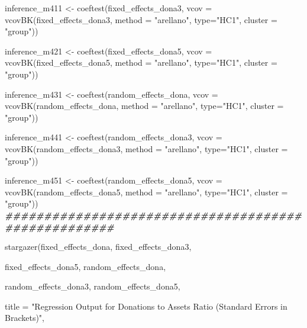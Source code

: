 \documentclass[a4paper,nobind]{templates/ociamthesis}
\newenvironment{Shaded}{\begin{snugshade}}{\end{snugshade}}
\newcommand{\AttributeTok}[1]{\textcolor[rgb]{0.77,0.63,0.00}{#1}}
\newcommand{\DocumentationTok}[1]{\textcolor[rgb]{0.56,0.35,0.01}{\textbf{\textit{#1}}}}
\newcommand{\FunctionTok}[1]{\textcolor[rgb]{0.00,0.00,0.00}{#1}}
\newcommand{\NormalTok}[1]{#1}
\newcommand{\OtherTok}[1]{\textcolor[rgb]{0.56,0.35,0.01}{#1}}
\newcommand{\StringTok}[1]{\textcolor[rgb]{0.31,0.60,0.02}{#1}}
\renewenvironment{Shaded}
{
  \vspace{10pt}%
  \begin{snugshade}%
}{%
  \end{snugshade}%
  \vspace{8pt}%
}
\begin{document}
\begin{landscape}
\begin{Shaded}
\begin{Highlighting}[]
\NormalTok{inference\_m411 }\OtherTok{\textless{}{-}} \FunctionTok{coeftest}\NormalTok{(fixed\_effects\_dona3, }\AttributeTok{vcov =} \FunctionTok{vcovBK}\NormalTok{(fixed\_effects\_dona3, }\AttributeTok{method =} \StringTok{"arellano"}\NormalTok{, }\AttributeTok{type=}\StringTok{"HC1"}\NormalTok{, }\AttributeTok{cluster =} \StringTok{"group"}\NormalTok{))}

\NormalTok{inference\_m421 }\OtherTok{\textless{}{-}} \FunctionTok{coeftest}\NormalTok{(fixed\_effects\_dona5, }\AttributeTok{vcov =} \FunctionTok{vcovBK}\NormalTok{(fixed\_effects\_dona5, }\AttributeTok{method =} \StringTok{"arellano"}\NormalTok{, }\AttributeTok{type=}\StringTok{"HC1"}\NormalTok{, }\AttributeTok{cluster =} \StringTok{"group"}\NormalTok{))}

\NormalTok{inference\_m431 }\OtherTok{\textless{}{-}} \FunctionTok{coeftest}\NormalTok{(random\_effects\_dona, }\AttributeTok{vcov =} \FunctionTok{vcovBK}\NormalTok{(random\_effects\_dona, }\AttributeTok{method =} \StringTok{"arellano"}\NormalTok{, }\AttributeTok{type=}\StringTok{"HC1"}\NormalTok{, }\AttributeTok{cluster =} \StringTok{"group"}\NormalTok{))}

\NormalTok{inference\_m441 }\OtherTok{\textless{}{-}} \FunctionTok{coeftest}\NormalTok{(random\_effects\_dona3, }\AttributeTok{vcov =} \FunctionTok{vcovBK}\NormalTok{(random\_effects\_dona3, }\AttributeTok{method =} \StringTok{"arellano"}\NormalTok{, }\AttributeTok{type=}\StringTok{"HC1"}\NormalTok{, }\AttributeTok{cluster =} \StringTok{"group"}\NormalTok{))}

\NormalTok{inference\_m451 }\OtherTok{\textless{}{-}} \FunctionTok{coeftest}\NormalTok{(random\_effects\_dona5, }\AttributeTok{vcov =} \FunctionTok{vcovBK}\NormalTok{(random\_effects\_dona5, }\AttributeTok{method =} \StringTok{"arellano"}\NormalTok{, }\AttributeTok{type=}\StringTok{"HC1"}\NormalTok{, }\AttributeTok{cluster =} \StringTok{"group"}\NormalTok{))}
\DocumentationTok{\#\#\#\#\#\#\#\#\#\#\#\#\#\#\#\#\#\#\#\#\#\#\#\#\#\#\#\#\#\#\#\#\#\#\#\#\#\#\#\#\#\#\#\#\#\#\#\#\#\#\#\#}


\FunctionTok{stargazer}\NormalTok{(fixed\_effects\_dona, fixed\_effects\_dona3, }
          
\NormalTok{         fixed\_effects\_dona5, random\_effects\_dona, }
         
\NormalTok{         random\_effects\_dona3, random\_effects\_dona5,}
         
         \AttributeTok{title =} \StringTok{"Regression Output for Donations to Assets Ratio (Standard Errors in Brackets)"}\NormalTok{, }
          

\end{Highlighting}
\end{Shaded}
\end{landscape}
\end{document}

